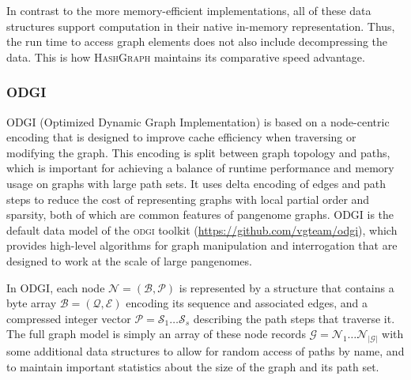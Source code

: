 \documentclass{bioinfo}
\begin{document}
\begin{methods}
In contrast to the more memory-efficient implementations, all of these data structures support computation in their native in-memory representation.
Thus, the run time to access graph elements does not also include decompressing the data.
This is how \textsc{HashGraph} maintains its comparative speed advantage.


\subsubsection{\textsc{ODGI}}

\textsc{ODGI} (Optimized Dynamic Graph Implementation) is based on a node-centric encoding that is designed to improve cache efficiency when traversing or modifying the graph.
This encoding is split between graph topology and paths, which is important for achieving a balance of runtime performance and memory usage on graphs with large path sets.
It uses delta encoding of edges and path steps to reduce the cost of representing graphs with local partial order and sparsity, both of which are common features of pangenome graphs.
\textsc{ODGI} is the default data model of the \textsc{odgi} toolkit (\url{https://github.com/vgteam/odgi}), which provides high-level algorithms for graph manipulation and interrogation that are designed to work at the scale of large pangenomes.

In \textsc{ODGI}, each node $\mathcal{N} = ( \mathcal{B}, \mathcal{P} )$ is represented by a structure that contains a byte array $\mathcal{B} = (\mathcal{Q}, \mathcal{E})$ encoding its sequence and associated edges, and a compressed integer vector $\mathcal{P} = \mathcal{S}_1 \ldots \mathcal{S}_{s}$ describing the path steps that traverse it.
The full graph model is simply an array of these node records $\mathcal{G} = \mathcal{N}_1 \ldots \mathcal{N}_{|\mathcal{G}|}$ with some additional data structures to allow for random access of paths by name, and to maintain important statistics about the size of the graph and its path set.


\end{methods}
\end{document}
